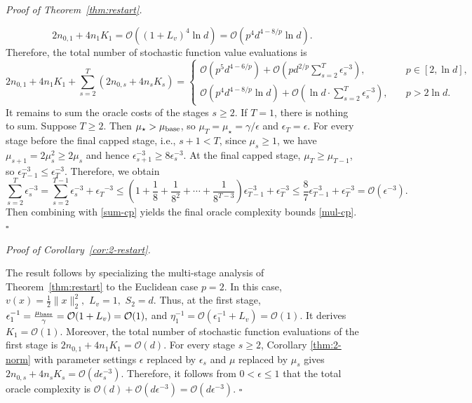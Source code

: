 \documentclass[11pt]{article}
\newenvironment{proof}[1][Proof]{%
    \par\noindent\textit{#1.}\enspace
  }{%
    \hfill\ensuremath{\square}\par
  }%
\numberwithin{equation}{section}
\newcommand{\be}{\begin{equation}}
\newcommand{\ee}{\end{equation}}
\begin{document}
\begin{proof}[Proof of Theorem~\ref{thm:restart}]
\[
2n_{0,1}+4n_1K_1
=\mathcal O((1+L_v)^4\ln d)
=\mathcal O(p^4d^{4-8/p}\ln d).\]
Therefore, the total number of stochastic function value evaluations is 
\be\label{sum-cp}
2n_{0,1} + 4n_1K_1 + \sum_{s= 2}^T (2n_{0,s} + 4n_s K_s) = \begin{cases}
\mathcal O(p^5d^{4-6/p}) + \mathcal O(pd^{2/p} \sum_{s=2}^T\epsilon_s^{-3} ),& \quad p\in[2,\ln d],\\
\mathcal O(p^4d^{4-8/p}\ln d) + \mathcal O(\ln d\cdot \sum_{s=2}^T \epsilon_s^{-3}),& \quad p>2\ln d.
\end{cases}
\ee
It remains to sum the oracle costs of the stages \(s\ge2\). If \(T=1\), there is nothing to sum. Suppose \(T\ge2\). Then \(\mu_\star>\mu_{\rm base}\), so \(\mu_T=\mu_\star=\gamma/\epsilon\) and \(\epsilon_T=\epsilon\). For every stage before the final capped stage, i.e., \(s+1<T\), since \(\mu_s\ge1\), we have \(\mu_{s+1}=2\mu_s^2\ge2\mu_s\) and hence \(\epsilon_{s+1}^{-3}\ge8\epsilon_s^{-3}\). 
At the final capped stage, \(\mu_T\ge\mu_{T-1}\), so \(\epsilon_{T-1}^{-3}\le\epsilon_T^{-3}\).   Therefore, we obtain
\[
\sum_{s=2}^{T}\epsilon_s^{-3} = \sum_{s=2}^{T-1}\epsilon_s^{-3} + {\epsilon_T}^{-3}
\le(1+\frac18+\frac1{8^2}+\cdots+\frac{1}{8^{T-3}})\epsilon_{T-1}^{-3}
 + \epsilon_T^{-3} \le\frac87\epsilon_{T-1}^{-3}  + \epsilon_T^{-3}=\mathcal O(\epsilon^{-3}).
\]
Then combining with \eqref{sum-cp} yields the final oracle complexity bounds \eqref{mul-cp}.
\end{proof}


\begin{proof}[Proof of Corollary~\ref{cor:2-restart}]
The result follows by specializing the multi-stage analysis of
Theorem~\ref{thm:restart} to the Euclidean case \(p=2\). 
In this case, \(v(x)=\frac12\|x\|_2^2,\) \(L_v=1,\) \(S_2=d .\)
Thus, at the first stage,  \(\epsilon_1^{-1}=\frac{\mu_{\rm base}}{\gamma}=\mathcal O(1+L_v)=\mathcal O(1),\) and \(\eta_1^{-1}=\mathcal O(\epsilon_1^{-1}+L_v)=\mathcal O(1).\)  It derives \(K_1=\mathcal O(1)\).
Moreover, the total number of stochastic function evaluations of the first stage is
\( 
2n_{0,1}+4n_1K_1 =\mathcal O(d).
\) 
For every stage \(s\ge2\), Corollary \ref{thm:2-norm}
with parameter settings \(\epsilon\) replaced by \(\epsilon_s\) and \(\mu\) replaced by
\(\mu_s\) gives
\(
    2n_{0,s}+4n_sK_s
    =
    \mathcal O(d\epsilon_s^{-3}).
\) 
Therefore, it follows from \(0<\epsilon\le1\) that the total oracle complexity is
\( \mathcal O(d)+\mathcal O(d\epsilon^{-3})=\mathcal O(d\epsilon^{-3})\).
\end{proof}
\end{document}
